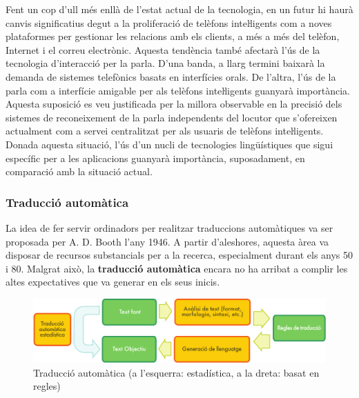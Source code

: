 \begin{multicols}{2}
Fent un cop d’ull més enllà de l’estat actual de la tecnologia, en un futur hi haurà canvis significatius degut a la proliferació de telèfons inteŀligents com a noves plataformes per gestionar les relacions amb els clients, a més a més del telèfon, Internet i el correu electrònic. Aquesta tendència també afectarà l’ús de la tecnologia d’interacció per la parla. D’una banda, a llarg termini baixarà la demanda de sistemes telefònics basats en interfícies orals. De l’altra, l’ús de la parla com a interfície amigable per als telèfons inteŀligents guanyarà importància. Aquesta suposició es veu justificada per la millora observable en la precisió dels sistemes de reconeixement de la parla independents del locutor que s’ofereixen actualment com a servei centralitzat per als usuaris de telèfons inteŀligents. Donada aquesta situació, l’ús d’un nucli de tecnologies lingüístiques que sigui específic per a les aplicacions guanyarà importància, suposadament, en comparació amb la situació actual. 

\subsubsection{Traducció automàtica}

La idea de fer servir ordinadors per realitzar traduccions automàtiques va ser proposada per A. D. Booth l’any 1946. A partir d’aleshores, aquesta àrea va disposar de recursos substancials per a la recerca, especialment durant els anys 50 i 80. Malgrat això, la \textbf{traducció automàtica} encara no ha arribat a complir les altes expectatives que va generar en els seus inicis.  

\begin{figure}[htb]
  \vspace{-21mm}
  \center
  \includegraphics[width=\textwidth]{../_media/catalan/machine_translation}
  \vspace{-2mm}
  \caption{Traducció automàtica (a l'esquerra: estadística, a la dreta: basat en regles)}
  \label{fig:mtarch_ca}
\end{figure}


\end{multicols}
